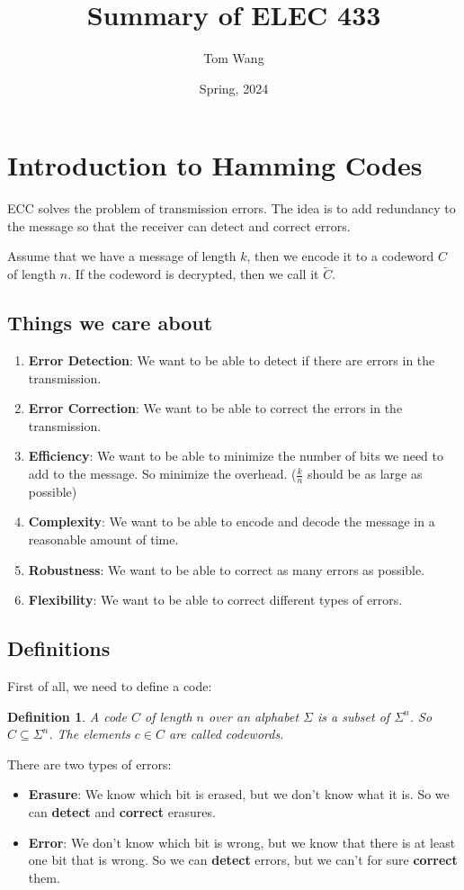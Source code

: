 \documentclass[letterpaper,12pt]{article}
\title{Summary of ELEC 433}
\author{Tom Wang}
\date{Spring, 2024}
\newtheorem{definition}{Definition}
\begin{document}
\maketitle
\section{Introduction to Hamming Codes}
ECC solves the problem of transmission errors. The idea is to add redundancy to
the message so that the receiver can detect and correct errors.

Assume that we have a message of length $k$, then we encode it to a codeword
$C$ of length $n$. If the codeword is decrypted, then we call it $\tilde{C}$.

\subsection{Things we care about}
\begin{enumerate}
    \item \textbf{Error Detection}: We want to be able to detect if there are errors in the transmission.
    \item \textbf{Error Correction}: We want to be able to correct the errors in the transmission.
    \item \textbf{Efficiency}: We want to be able to minimize the number of bits we need to add to the message. So minimize the overhead. ($\frac{k}{n}$ should be as large as possible)
    \item \textbf{Complexity}: We want to be able to encode and decode the message in a reasonable amount of time.
    \item \textbf{Robustness}: We want to be able to correct as many errors as possible.
    \item \textbf{Flexibility}: We want to be able to correct different types of errors.
\end{enumerate}
\subsection{Definitions}
First of all, we need to define a code:

\begin{definition}
    A code $C$ of length $n$ over an alphabet $\Sigma$ is a subset of $\Sigma^n$. So $C\subseteq \Sigma^n$. The elements $c\in C$ are called codewords.
\end{definition}

There are two types of errors:\begin{itemize}
    \item \textbf{Erasure}: We know which bit is erased, but we don't know what it is. So we can \textbf{detect} and \textbf{correct} erasures.
    \item \textbf{Error}: We don't know which bit is wrong, but we know that there is at least one bit that is wrong. So we can \textbf{detect} errors, but we can't for sure \textbf{correct} them.
\end{itemize}
\end{document}
